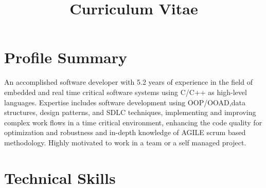 \documentclass[11pt,a4paper,sans]{moderncv} %
\title{Curriculum Vitae}
\begin{document}
\makecvtitle %


\section{Profile Summary }
An accomplished software developer with 5.2 years of experience in the field of embedded and real time critical software systems using C/C++ as high-level languages.
Expertise includes software development using OOP/OOAD,data structures, design patterns, and SDLC techniques, implementing and improving complex work flows in a time critical environment, enhancing the code quality for optimization and robustness and in-depth knowledge of  AGILE scrum based methodology.
Highly motivated to work in a team or a self managed project.


\section{Technical Skills}

\end{document}
